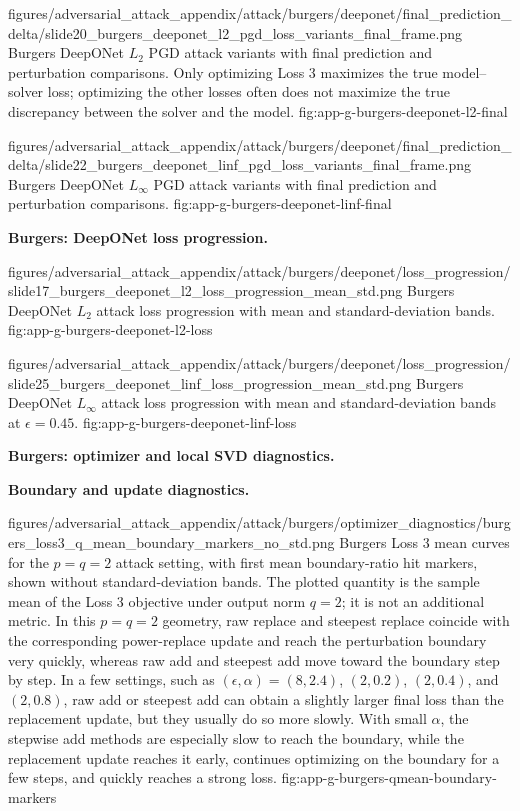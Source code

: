 \documentclass[letterpaper]{article} %
\begin{document}
\appendixattackfigcompact
  {figures/adversarial_attack_appendix/attack/burgers/deeponet/final_prediction_delta/slide20_burgers_deeponet_l2_pgd_loss_variants_final_frame.png}
  {Burgers DeepONet $L_2$ PGD attack variants with final prediction and
  perturbation comparisons. Only optimizing Loss 3 maximizes the true
  model--solver loss; optimizing the other losses often does not maximize the
  true discrepancy between the solver and the model.}
  {fig:app-g-burgers-deeponet-l2-final}

\appendixattackfigcompact
  {figures/adversarial_attack_appendix/attack/burgers/deeponet/final_prediction_delta/slide22_burgers_deeponet_linf_pgd_loss_variants_final_frame.png}
  {Burgers DeepONet $L_\infty$ PGD attack variants with final prediction and
  perturbation comparisons.}
  {fig:app-g-burgers-deeponet-linf-final}

\noindent\textbf{Burgers: DeepONet loss progression.}

\appendixattackfig
  {figures/adversarial_attack_appendix/attack/burgers/deeponet/loss_progression/slide17_burgers_deeponet_l2_loss_progression_mean_std.png}
  {Burgers DeepONet $L_2$ attack loss progression with mean and
  standard-deviation bands.}
  {fig:app-g-burgers-deeponet-l2-loss}

\appendixattackfig
  {figures/adversarial_attack_appendix/attack/burgers/deeponet/loss_progression/slide25_burgers_deeponet_linf_loss_progression_mean_std.png}
  {Burgers DeepONet $L_\infty$ attack loss progression with mean and
  standard-deviation bands at $\epsilon=0.45$.}
  {fig:app-g-burgers-deeponet-linf-loss}

\clearpage
\noindent\textbf{Burgers: optimizer and local SVD diagnostics.}

\noindent\textbf{Boundary and update diagnostics.}

\appendixattackfig
  {figures/adversarial_attack_appendix/attack/burgers/optimizer_diagnostics/burgers_loss3_q_mean_boundary_markers_no_std.png}
  {Burgers Loss 3 mean curves for the $p=q=2$ attack setting, with first mean
  boundary-ratio hit markers, shown without standard-deviation bands. The
  plotted quantity is the sample mean of the Loss 3 objective under output
  norm $q=2$; it is not an additional metric. In this $p=q=2$ geometry, raw
  replace and steepest replace coincide with the corresponding power-replace
  update and reach the
  perturbation boundary very quickly, whereas raw add and steepest add move
  toward the boundary step by step. In a few settings, such as
  $(\epsilon,\alpha)=(8,2.4)$, $(2,0.2)$, $(2,0.4)$, and $(2,0.8)$, raw add or
  steepest add can obtain a slightly larger final loss than the replacement
  update, but they usually do so more slowly. With small $\alpha$, the stepwise
  add methods are especially slow to reach the boundary, while the replacement
  update reaches it early, continues optimizing on the boundary for a few steps,
  and quickly reaches a strong loss.}
  {fig:app-g-burgers-qmean-boundary-markers}
\end{document}
